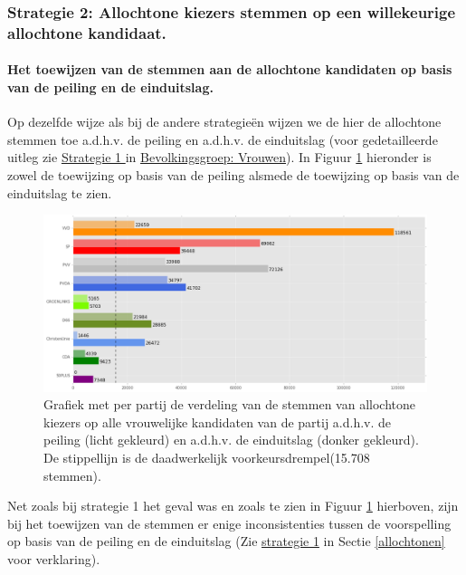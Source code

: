 \subsubsection{Strategie 2: Allochtone kiezers stemmen op een willekeurige allochtone kandidaat.}





\paragraph{Het toewijzen van de stemmen aan de allochtone kandidaten op basis van de peiling en de einduitslag.}
Op dezelfde wijze als bij de andere strategie\"{e}n wijzen we de hier de allochtone stemmen toe a.d.h.v. de peiling en a.d.h.v. de einduitslag (voor gedetailleerde uitleg zie \hyperref[S1V]{Strategie 1 }in \hyperref[vrouwen]{Bevolkingsgroep: Vrouwen}). In Figuur \ref{fig:stemmenS2A} hieronder is zowel de toewijzing op basis van de peiling alsmede de toewijzing op basis van de einduitslag te zien.
 


\begin{figure}[H]

	\includegraphics[width=\linewidth]	{stemmen_op_allochtonen_willekeurig_samen2.png}

			\caption{Grafiek met per partij de verdeling van de stemmen van allochtone kiezers op alle vrouwelijke kandidaten van de partij a.d.h.v. de peiling (licht gekleurd) en a.d.h.v. de einduitslag (donker gekleurd). De stippellijn is de daadwerkelijk voorkeursdrempel(15.708 stemmen).}

\label{fig:stemmenS2A}
\end{figure}

Net zoals bij strategie 1 het geval was en zoals te zien in Figuur \ref{fig:stemmenS2A} hierboven, zijn bij het toewijzen van de stemmen er enige inconsistenties tussen de voorspelling op basis van de peiling en de einduitslag (Zie \hyperref[S1A]{strategie 1} in Sectie \ref{allochtonen} voor verklaring).

